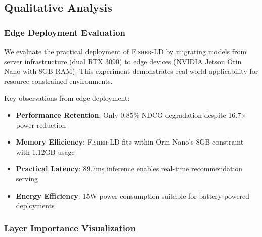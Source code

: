\documentclass[10pt,conference]{IEEEtran}
\newcommand{\fisherld}{\textsc{Fisher-LD}}
\begin{document}
\subsection{Qualitative Analysis}

\subsubsection{Edge Deployment Evaluation}

We evaluate the practical deployment of \fisherld{} by migrating models from server infrastructure (dual RTX 3090) to edge devices (NVIDIA Jetson Orin Nano with 8GB RAM). This experiment demonstrates real-world applicability for resource-constrained environments.

\begin{table}[t]
\centering
\caption{Edge deployment performance comparison}
\label{tab:edge_deployment}
\end{table}

Key observations from edge deployment:
\begin{itemize}[leftmargin=*]
    \item \textbf{Performance Retention}: Only 0.85\% NDCG degradation despite 16.7× power reduction
    \item \textbf{Memory Efficiency}: \fisherld{} fits within Orin Nano's 8GB constraint with 1.12GB usage
    \item \textbf{Practical Latency}: 89.7ms inference enables real-time recommendation serving
    \item \textbf{Energy Efficiency}: 15W power consumption suitable for battery-powered deployments
\end{itemize}

\subsubsection{Layer Importance Visualization}
\end{document}
